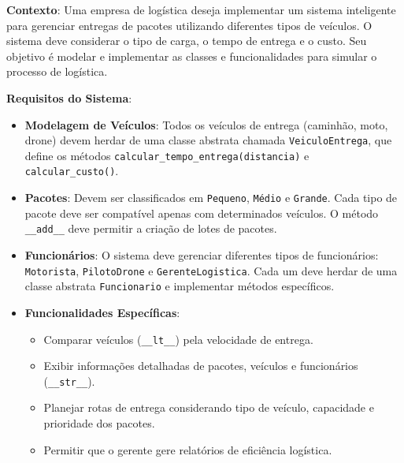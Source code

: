 \textbf{Contexto}:  
Uma empresa de logística deseja implementar um sistema inteligente para gerenciar entregas de pacotes utilizando diferentes tipos de veículos. O sistema deve considerar o tipo de carga, o tempo de entrega e o custo. Seu objetivo é modelar e implementar as classes e funcionalidades para simular o processo de logística.

\textbf{Requisitos do Sistema}:  
\begin{itemize}
    \item \textbf{Modelagem de Veículos}:  
    Todos os veículos de entrega (caminhão, moto, drone) devem herdar de uma classe abstrata chamada \texttt{VeiculoEntrega}, que define os métodos \texttt{calcular\_tempo\_entrega(distancia)} e \texttt{calcular\_custo()}.

    \item \textbf{Pacotes}:  
    Devem ser classificados em \texttt{Pequeno}, \texttt{Médio} e \texttt{Grande}.  
    Cada tipo de pacote deve ser compatível apenas com determinados veículos.  
    O método \texttt{\_\_add\_\_} deve permitir a criação de lotes de pacotes.

    \item \textbf{Funcionários}:  
    O sistema deve gerenciar diferentes tipos de funcionários: \texttt{Motorista}, \texttt{PilotoDrone} e \texttt{GerenteLogistica}.  
    Cada um deve herdar de uma classe abstrata \texttt{Funcionario} e implementar métodos específicos.

    \item \textbf{Funcionalidades Específicas}:  
    \begin{itemize}
        \item Comparar veículos (\texttt{\_\_lt\_\_}) pela velocidade de entrega.  
        \item Exibir informações detalhadas de pacotes, veículos e funcionários (\texttt{\_\_str\_\_}).  
        \item Planejar rotas de entrega considerando tipo de veículo, capacidade e prioridade dos pacotes.  
        \item Permitir que o gerente gere relatórios de eficiência logística.  
    \end{itemize}
\end{itemize}


    
